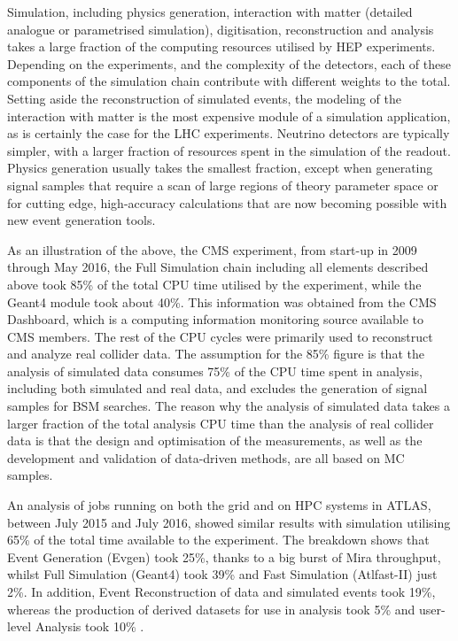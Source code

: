 \documentclass[12pt,a4paper]{article}
\begin{document}
Simulation, including physics generation, interaction with matter
(detailed analogue or parametrised simulation), digitisation,
reconstruction and analysis takes a large fraction of the computing
resources utilised by HEP experiments. Depending on the experiments, and
the complexity of the detectors, each of these components of the
simulation chain contribute with different weights to the total. Setting
aside the reconstruction of simulated events, the modeling of the
interaction with matter is the most expensive module of a simulation
application, as is certainly the case for the LHC experiments. Neutrino
detectors are typically simpler, with a larger fraction of resources
spent in the simulation of the readout. Physics generation usually takes
the smallest fraction, except when generating signal samples that
require a scan of large regions of theory parameter space or for cutting
edge, high-accuracy calculations that are now becoming possible with new
event generation tools.

As an illustration of the above, the CMS experiment, from start-up in
2009 through May 2016, the Full Simulation chain including all elements
described above took 85\% of the total CPU time utilised by the
experiment, while the Geant4 module took about 40\%. This information
was obtained from the CMS Dashboard, which is a computing information
monitoring source available to CMS members. The rest of the CPU cycles
were primarily used to reconstruct and analyze real collider data. The
assumption for the 85\% figure is that the analysis of simulated data
consumes 75\% of the CPU time spent in analysis, including both
simulated and real data, and excludes the generation of signal samples
for BSM searches. The reason why the analysis of simulated data takes a
larger fraction of the total analysis CPU time than the analysis of real
collider data is that the design and optimisation of the measurements,
as well as the development and validation of data-driven methods, are
all based on MC samples.

An analysis of jobs running on both the grid and on HPC systems in
ATLAS, between July 2015 and July 2016, showed similar results with
simulation utilising 65\% of the total time available to the experiment.
The breakdown shows that Event Generation (Evgen) took 25\%, thanks to a
big burst of Mira throughput, whilst Full Simulation (Geant4) took 39\%
and Fast Simulation (Atlfast-II) just 2\%. In addition, Event
Reconstruction of data and simulated events took 19\%, whereas the
production of derived datasets for use in analysis took 5\% and
user-level Analysis took 10\% .
\end{document}
